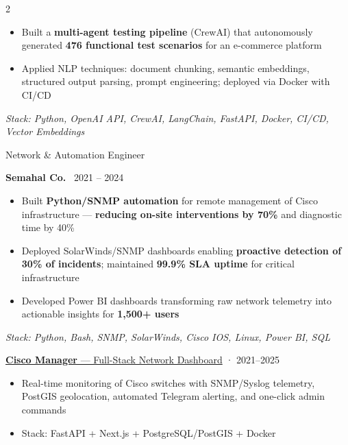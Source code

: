 \documentclass[7pt,a4paper,withhyper]{altacv}
\renewcommand{\cvevent}[4]{%
  {\large\color{emphasis}\raggedright #1\par}
  \smallskip\normalsize
  \ifstrequal{#2}{}{}{%
    \textbf{\color{accent}#2}%
  }%
  \ifstrequal{#4}{}{}{%
    \ifstrequal{#2}{}{}{\hspace{1.5em}}%
    {\small\cvLocationMarker~#4}%
  }%
  \ifstrequal{#3}{}{}{%
    \hfill{\small\cvDateMarker~#3}%
  }\par
}
\providecommand{\cvgithub}{github-username}
\begin{document}
\begin{paracol}{2}
\begin{itemize}[leftmargin=1.25em, itemsep=0pt, parsep=0pt]
\item \justifying Built a \textbf{multi-agent testing pipeline} (CrewAI) that autonomously generated \textbf{476 functional test scenarios} for an e-commerce platform
\item \justifying Applied NLP techniques: document chunking, semantic embeddings, structured output parsing, prompt engineering; deployed via Docker with CI/CD
\end{itemize}
\smallskip\noindent\textit{Stack: Python, OpenAI API, CrewAI, LangChain, FastAPI, Docker, CI/CD, Vector Embeddings}\par

\vspace{0.25em}\par\vspace{0.25em}

\cvevent{Network \& Automation Engineer}{Semahal Co.}{2021 – 2024}{}
\smallskip
\begin{itemize}[leftmargin=1.25em, itemsep=0pt, parsep=0pt]
\item \justifying Built \textbf{Python/SNMP automation} for remote management of Cisco infrastructure — \textbf{reducing on-site interventions by 70\%} and diagnostic time by 40\%
\item \justifying Deployed SolarWinds/SNMP dashboards enabling \textbf{proactive detection of 30\% of incidents}; maintained \textbf{99.9\% SLA uptime} for critical infrastructure
\item \justifying Developed Power BI dashboards transforming raw network telemetry into actionable insights for \textbf{1,500+ users}
\end{itemize}
\smallskip\noindent\textit{Stack: Python, Bash, SNMP, SolarWinds, Cisco IOS, Linux, Power BI, SQL}\par

\vspace{-0.5ex}

{\large\color{emphasis}\raggedright\href{https://github.com/\cvgithub/cisco-manager}{\textbf{Cisco Manager} — Full-Stack Network Dashboard} {\small\color{LightGrey}· 2021–2025}\par}
\vspace{0.1em}
\begin{itemize}[leftmargin=1.25em, nosep]
\item \justifying Real-time monitoring of Cisco switches with SNMP/Syslog telemetry, PostGIS geolocation, automated Telegram alerting, and one-click admin commands
\item \justifying Stack: FastAPI + Next.js + PostgreSQL/PostGIS + Docker
\end{itemize}\par
\vspace{0.1em}\par\vspace{0.1em}


\end{paracol}
\end{document}
